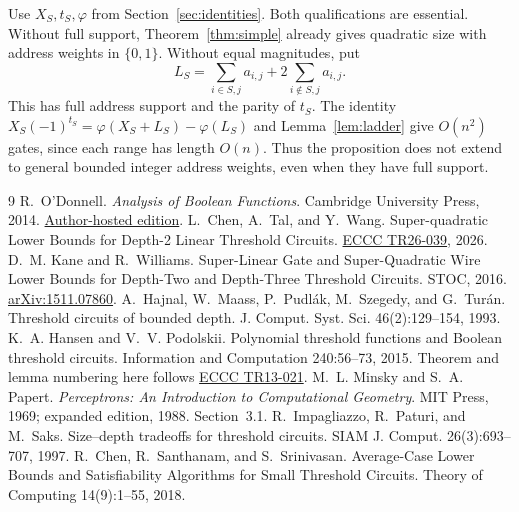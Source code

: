 \documentclass[11pt]{article}
\begin{document}
Use $X_S,t_S,\varphi$ from Section~\ref{sec:identities}.
Both qualifications are essential. Without full support,
Theorem~\ref{thm:simple} already gives quadratic size with address weights
in $\{0,1\}$. Without equal magnitudes, put
$$L_S=\sum_{i\in S,j}a_{i,j}+2\sum_{i\notin S,j}a_{i,j}.$$
This has full address support and the parity of $t_S$.
The identity $X_S(-1)^{t_S}=\varphi(X_S+L_S)-\varphi(L_S)$ and
Lemma~\ref{lem:ladder} give $O(n^2)$ gates, since each range has length
$O(n)$. Thus the proposition does not extend to general bounded integer
address weights, even when they have full support.

\begin{thebibliography}{9}\small
{} R.~O'Donnell. \emph{Analysis of Boolean Functions}.
Cambridge University Press, 2014.
\href{https://www.cs.cmu.edu/~odonnell/papers/Analysis-of-Boolean-Functions-by-Ryan-ODonnell.pdf}{Author-hosted edition}.
 L.~Chen, A.~Tal, and Y.~Wang.
Super-quadratic Lower Bounds for Depth-2 Linear Threshold Circuits.
\href{https://eccc.weizmann.ac.il/report/2026/039/}{ECCC TR26-039}, 2026.
 D.~M. Kane and R.~Williams.
Super-Linear Gate and Super-Quadratic Wire Lower Bounds for Depth-Two and
Depth-Three Threshold Circuits. STOC, 2016.
\href{https://arxiv.org/abs/1511.07860}{arXiv:1511.07860}.
 A.~Hajnal, W.~Maass, P.~Pudl\'ak, M.~Szegedy, and G.~Tur\'an.
Threshold circuits of bounded depth. J. Comput. Syst. Sci. 46(2):129--154, 1993.
 K.~A. Hansen and V.~V. Podolskii.
Polynomial threshold functions and Boolean threshold circuits.
Information and Computation 240:56--73, 2015.
Theorem and lemma numbering here follows
\href{https://eccc.weizmann.ac.il/report/2013/021/download/}{ECCC TR13-021}.
 M.~L. Minsky and S.~A. Papert.
\emph{Perceptrons: An Introduction to Computational Geometry}.
MIT Press, 1969; expanded edition, 1988. Section~3.1.
 R.~Impagliazzo, R.~Paturi, and M.~Saks.
Size--depth tradeoffs for threshold circuits. SIAM J. Comput. 26(3):693--707, 1997.
 R.~Chen, R.~Santhanam, and S.~Srinivasan.
Average-Case Lower Bounds and Satisfiability Algorithms for Small Threshold
Circuits. Theory of Computing 14(9):1--55, 2018.
\end{thebibliography}
\end{document}
